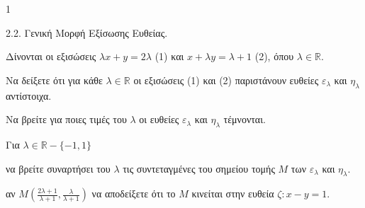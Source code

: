 \begin{ylh}{1}
    \item 2.2. Γενική Μορφή Εξίσωσης Ευθείας.
\end{ylh}
Δίνονται οι εξισώσεις $\lambda x + y = 2\lambda$ (1) και $x + \lambda y = \lambda + 1$ (2), όπου $\lambda \in \mathbb{R}$.
\begin{alist}
\item Να δείξετε ότι για κάθε $\lambda \in \mathbb{R}$ οι εξισώσεις (1) και (2) παριστάνουν ευθείες $\varepsilon_\lambda$ και $\eta_\lambda$ αντίστοιχα. 
\item Να βρείτε για ποιες τιμές του $\lambda$ οι ευθείες $\varepsilon_\lambda$ και $\eta_\lambda$ τέμνονται. 
\item Για $\lambda \in \mathbb{R}-\{-1,1\}$
    \begin{rlist}
    \item να βρείτε συναρτήσει του $\lambda$ τις συντεταγμένες του σημείου τομής $M$ των $\varepsilon_\lambda$ και $\eta_\lambda$. 
    \item αν $M\left(\frac{2\lambda+1}{\lambda+1}, \frac{\lambda}{\lambda+1}\right)$ να αποδείξετε ότι το $M$ κινείται στην ευθεία $\zeta : x - y = 1$. 
    \end{rlist}
\end{alist}